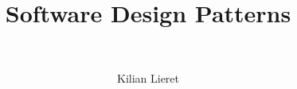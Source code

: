 %
\title{Software Design Patterns}
\subtitle{\ \relax}
\author{Kilian Lieret}
\newcommand*{\coauthors}{}
%
%
%
